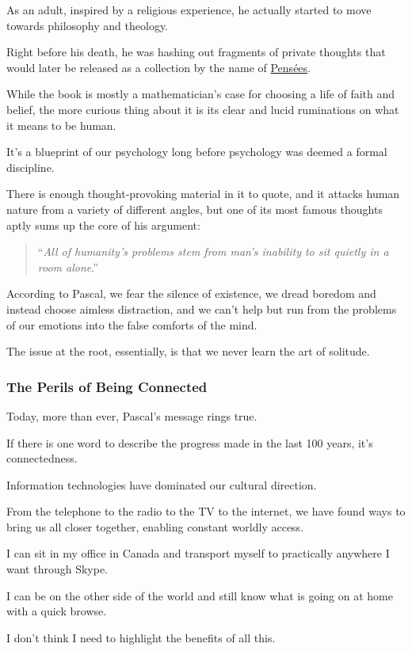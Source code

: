\documentclass{article}
\begin{document}
As an adult, inspired by a religious experience, he actually started to move towards philosophy and theology.

%
Right before his death, he was hashing out fragments of private thoughts that would later be released as a collection by the name of \href{https://designluck.com/recommends/pascals-pensees/}{Pensées}.

%
While the book is mostly a mathematician's case for choosing a life of faith and belief, the more curious thing about it is its clear and lucid ruminations on what it means to be human.

It's a blueprint of our psychology long before psychology was deemed a formal discipline.

%
There is enough thought-provoking material in it to quote, and it attacks human nature from a variety of different angles, but one of its most famous thoughts aptly sums up the core of his argument:

\begin{quotation}
	``\textit{All of humanity's problems stem from man's inability to sit quietly in a room alone}.''
\end{quotation}
According to Pascal, we fear the silence of existence, we dread boredom and instead choose aimless distraction, and we can't help but run from the problems of our emotions into the false comforts of the mind.

%
The issue at the root, essentially, is that we never learn the art of solitude.

\subsubsection{The Perils of Being Connected}
Today, more than ever, Pascal's message rings true.

If there is one word to describe the progress made in the last 100 years, it's connectedness.

%
Information technologies have dominated our cultural direction.

From the telephone to the radio to the TV to the internet, we have found ways to bring us all closer together, enabling constant worldly access.

%
I can sit in my office in Canada and transport myself to practically anywhere I want through Skype.

I can be on the other side of the world and still know what is going on at home with a quick browse.

%
I don't think I need to highlight the benefits of all this.
\end{document}
